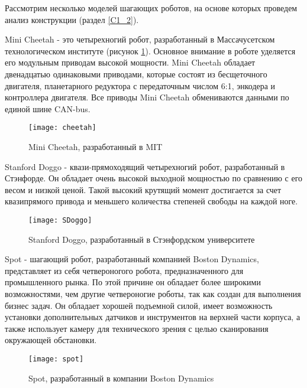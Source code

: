 Рассмотрим несколько моделей шагающих роботов, на основе которых проведем анализ конструкции (раздел \ref{C1_2}).

Mini Cheetah \cite{cheetah} - это четырехногий робот, разработанный в Массачусетском технологическом институте (рисунок \ref{cheetah}). Основное внимание в роботе уделяется его модульным приводам высокой мощности. Mini Cheetah обладает двенадцатью одинаковыми приводами, которые состоят из бесщеточного двигателя, планетарного редуктора с передаточным числом 6:1, энкодера и контроллера двигателя. Все приводы Mini Cheetah обмениваются данными по единой шине CAN-bus.
\begin{figure}[h!]
	\begin{center}
		\texttt{[image: cheetah]}
		\caption{Mini Cheetah, разработанный в MIT}
		\label{cheetah}
	\end{center}
\end{figure}

Stanford Doggo\cite{SDoggo} - квази-прямоходящий четырехногий робот, разработанный в Стэнфорде. Он обладает очень высокой выходной мощностью по сравнению с его весом и низкой ценой. Такой высокий крутящий момент достигается за счет квазипрямого привода и меньшего количества степеней свободы на каждой ноге.
\begin{figure}[h!]
	\begin{center}
		\texttt{[image: SDoggo]}
		\caption{Stanford Doggo, разработанный в Стэнфордском университете}
		\label{SDoggo}
	\end{center}
\end{figure}

Spot\cite{spot} - шагающий робот, разработанный компанией Boston Dynamics, представляет из себя четвероногого робота, предназначенного для промышленного рынка. По этой причине он обладает более широкими возможностями, чем другие четвероногие роботы, так как создан для выполнения бизнес задач. Он обладает хорошей подъемной силой, имеет возможность установки дополнительных датчиков и инструментов на верхней части корпуса, а также использует камеру для технического зрения с целью сканирования окружающей обстановки.
\begin{figure}[h!]
	\begin{center}
		\texttt{[image: spot]}
		\caption{Spot, разработанный в компании Boston Dynamics}
		\label{spot}
	\end{center}
\end{figure}


